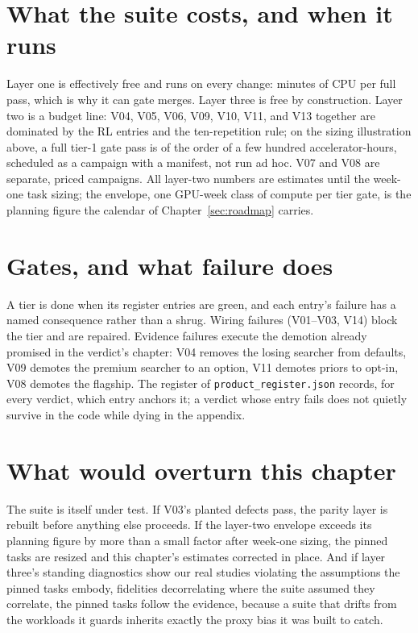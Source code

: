 \section{What the suite costs, and when it runs}

Layer one is effectively free and runs on every change: minutes of
CPU per full pass, which is why it can gate merges. Layer three is
free by construction. Layer two is a budget line: V04, V05, V06,
V09, V10, V11, and V13 together are dominated by the RL entries and
the ten-repetition rule; on the sizing illustration above, a full
tier-1 gate pass is of the order of a few hundred accelerator-hours,
scheduled as a campaign with a manifest, not run ad hoc. V07 and V08
are separate, priced campaigns. All layer-two numbers are estimates
until the week-one task sizing; the envelope, one GPU-week class of
compute per tier gate, is the planning figure the calendar of
Chapter~\ref{sec:roadmap} carries.

\section{Gates, and what failure does}

A tier is done when its register entries are green, and each entry's
failure has a named consequence rather than a shrug. Wiring failures
(V01--V03, V14) block the tier and are repaired. Evidence failures
execute the demotion already promised in the verdict's chapter:
V04 removes the losing searcher from defaults, V09 demotes the
premium searcher to an option, V11 demotes priors to opt-in, V08
demotes the flagship. The register of
\texttt{product\_register.json} records, for every verdict, which
entry anchors it; a verdict whose entry fails does not quietly
survive in the code while dying in the appendix.

\section{What would overturn this chapter}

The suite is itself under test. If V03's planted defects pass, the
parity layer is rebuilt before anything else proceeds. If the
layer-two envelope exceeds its planning figure by more than a small
factor after week-one sizing, the pinned tasks are resized and this
chapter's estimates corrected in place. And if layer three's
standing diagnostics show our real studies violating the
assumptions the pinned tasks embody, fidelities decorrelating where
the suite assumed they correlate, the pinned tasks follow the
evidence, because a suite that drifts from the workloads it guards
inherits exactly the proxy bias it was built to catch.
